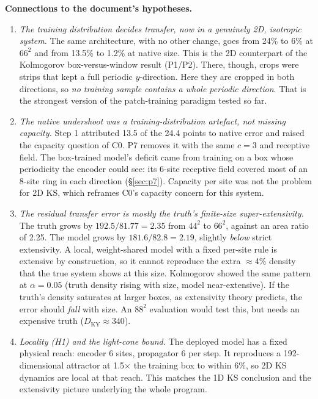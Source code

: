 \documentclass[11pt]{article}
\begin{document}
\textbf{Connections to the document's hypotheses.}
\begin{enumerate}[leftmargin=*]
\item \emph{The training distribution decides transfer, now in a
  genuinely 2D, isotropic system.} The same architecture, with no other
  change, goes from 24\% to 6\% at $66^2$ and from 13.5\% to 1.2\% at
  native size. This is the 2D counterpart of the Kolmogorov
  box-versus-window result (P1/P2). There, though, crops were strips
  that kept a full periodic $y$-direction. Here they are cropped in both
  directions, so \emph{no training sample contains a whole periodic
  direction}. That is the strongest version of the patch-training
  paradigm tested so far.
\item \emph{The native undershoot was a training-distribution artefact,
  not missing capacity.} Step 1 attributed 13.5 of the 24.4 points to
  native error and raised the capacity question of C0. P7 removes it
  with the same $c{=}3$ and receptive field. The box-trained model's
  deficit came from training on a box whose periodicity the encoder
  could see: its 6-site receptive field covered most of an 8-site ring
  in each direction (\S\ref{sec:p7}). Capacity per site was not the
  problem for 2D KS, which reframes C0's capacity concern for this
  system.
\item \emph{The residual transfer error is mostly the truth's
  finite-size super-extensivity.} The truth grows by $192.5/81.77 =
  2.35$ from $44^2$ to $66^2$, against an area ratio of 2.25. The model
  grows by $181.6/82.8 = 2.19$, slightly \emph{below} strict
  extensivity. A local, weight-shared model with a fixed per-site rule
  is extensive by construction, so it cannot reproduce the extra
  $\approx$4\% density that the true system shows at this size.
  Kolmogorov showed the same pattern at $\alpha{=}0.05$ (truth density
  rising with size, model near-extensive). If the truth's density
  saturates at larger boxes, as extensivity theory predicts, the error
  should \emph{fall} with size. An $88^2$ evaluation would test this,
  but needs an expensive truth ($D_{\mathrm{KY}}\approx340$).
\item \emph{Locality (H1) and the light-cone bound.} The deployed model
  has a fixed physical reach: encoder 6 sites, propagator 6 per step.
  It reproduces a 192-dimensional attractor at 1.5$\times$ the training
  box to within 6\%, so 2D KS dynamics are local at that reach. This
  matches the 1D KS conclusion and the extensivity picture underlying
  the whole program.
\end{enumerate}
\end{document}
